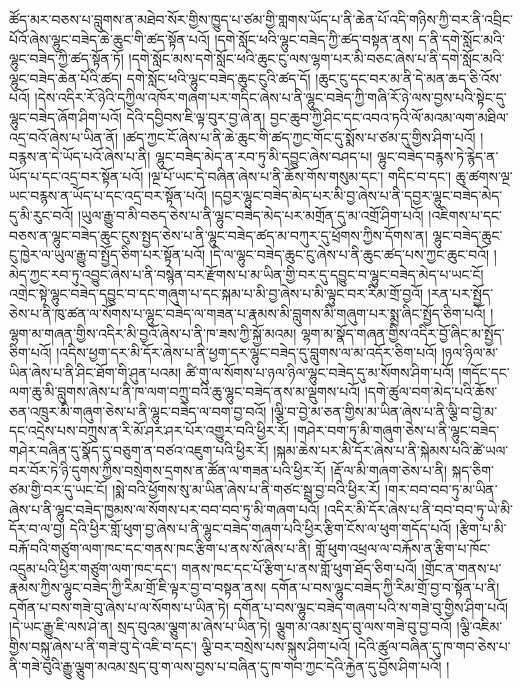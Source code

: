 ཚོད་མར་བཅས་པ་བླུགས་ན་མཐེབ་སོར་གྱིས་ཁྱུད་པ་ཙམ་གྱི་གླགས་ཡོད་པ་ནི་ཆེན་པོ་འདི་གཉིས་ཀྱི་བར་ནི་འབྲིང་པོའོ་ཞེས་ལྷུང་བཟེད་ཆེ་ཆུང་གི་ཚད་སྟོན་པའོ། །དགེ་སློང་ཕའི་ལྷུང་བཟེད་ཀྱི་ཚད་བསྟན་ནས། ད་ནི་དགེ་སློང་མའི་ལྷུང་བཟེད་ཀྱི་ཚད་སྟོན་ཏོ། །དགེ་སློང་མས་དགེ་སློང་ཕའི་ཆུང་ངུ་ལས་ལྷག་པར་མི་བཅང་ཞེས་པ་ནི་དགེ་སློང་མའི་ལྷུང་བཟེད་ཆེན་པོའི་ཚད། དགེ་སློང་ཕའི་ལྷུང་བཟེད་ཆུང་ངུའི་ཚད་དོ། །ཆུང་ངུ་དང་བར་མ་ནི་དེ་མན་ཆད་ཅི་འོས་པའོ། །དེས་འདིར་རོ་ཉེའི་དཀྱིལ་འཁོར་གཞག་པར་གདིང་ཞེས་པ་ནི་ལྷུང་བཟེད་ཀྱི་གཞི་རོ་ཉེ་ལས་བྱས་པའི་སྟེང་དུ་ལྷུང་བཟེད་ཞོག་ཤིག་པའོ། དེའི་དབྱིབས་ཇི་ལྟ་བུར་བྱ་ཞེ་ན། བྱང་ཆུབ་ཀྱི་ཤིང་དང་འབའ་ཏའི་ལོ་མའམ་ལག་མཐིལ་འདྲ་བའོ་ཞེས་པ་ཡིན་ནོ། །ཚད་ཀྱང་ངོ་ཞེས་པ་ནི་ཆེ་ཆུང་གི་ཚད་ཀྱང་གོང་དུ་སྨོས་པ་ཙམ་དུ་གྱིས་ཤིག་པའོ། །བརྙས་ན་དེ་ཡོད་པའོ་ཞེས་པ་ནི། ལྷུང་བཟེད་མེད་ན་རབ་ཏུ་མི་དབྱུང་ཞེས་བཤད་པ། ལྷུང་བཟེད་བརྙས་ཏེ་རྙེད་ན་ཡོད་པ་དང་འདྲ་བར་སྟོན་པའོ། །ལྔ་པོ་ཡང་དེ་བཞིན་ཞེས་པ་ནི་ཆོས་གོས་གསུམ་དང་། གདིང་བ་དང་། ཆུ་ཚགས་ལྔ་ཡང་བརྙས་ན་ཡོད་པ་དང་འདྲ་བར་སྟོན་པའོ། །དབྱར་ལྷུང་བཟེད་མེད་པར་མི་བྱ་ཞེས་པ་ནི་དབྱར་ལྷུང་བཟེད་མེད་དུ་མི་རུང་བའོ། །ཡུལ་རྒྱུ་བ་མི་བཅད་ཅེས་པ་ནི་ལྷུང་བཟེད་མེད་པར་མགྲོན་དུ་མ་འགྲོ་ཤིག་པའོ། །འཇིགས་པ་དང་བཅས་ན་ལྷུང་བཟེད་ཆུང་ངུས་སྤྱད་ཅེས་པ་ནི་ལྷུང་བཟེད་ཚད་མ་བཀུར་དུ་ཕྲོགས་ཀྱིས་དོགས་ན། ལྷུང་བཟེད་ཆུང་ངུ་ཁྱེར་ལ་ཡུལ་རྒྱུ་བ་སྤྱོད་ཅིག་པར་སྟོན་པའོ། །དེ་ལ་ལྷུང་བཟེད་ཆུང་ངུ་ཞེས་པ་ནི་ཆུང་ཚད་པས་ཀྱང་ཆུང་བའོ། །མེད་ཀྱང་རབ་ཏུ་འབྱུང་ཞེས་པ་ནི་བསྙེན་བར་རྫོགས་པ་མ་ཡིན་གྱི་བར་དུ་དབྱུང་བ་ལྷུང་བཟེད་མེད་པ་ཡང་ངོ། འགྲེང་སྟེ་ལྷུང་བཟེད་དབྱུང་བ་དང་གཞུག་པ་དང་སྐམ་པ་མི་བྱ་ཞེས་པ་མི་ལྟུང་བར་རིམ་གྲོ་བྱའོ། །རན་པར་སྤྱོད་ཅེས་པ་ནི་ཁུ་ཚན་ལ་སོགས་པ་ལྷུང་བཟེད་ལ་གཟན་པ་རྣམས་མི་བླུགས་མི་གཞུག་པར་སྨྲ་ཞིང་སྤྱོད་ཅིག་པའོ། །ལྷག་མ་གཞན་གྱིས་འདིར་མི་བྱའོ་ཞེས་པ་ནི་ཁ་ཟས་ཀྱི་སྐྱོ་མའམ། ལྷག་མ་སྣོད་གཞན་གྱིས་འདིར་བྱོ་ཞིང་མ་སྤྱོད་ཅིག་པའོ། །འདིས་ཕྱག་དར་མི་དོར་ཞེས་པ་ནི་ཕྱག་དར་ལྷུང་བཟེད་དུ་བླུགས་ལ་མ་འདོར་ཅིག་པའོ། །ཉལ་ཉིལ་མ་ཡིན་ཞེས་པ་ནི་ཤིང་ཐོག་གི་ཤུན་པའམ། ཚི་གུ་ལ་སོགས་པ་ཉལ་ཉིལ་ལྷུང་བཟེད་དུ་མ་སོགས་ཤིག་པའོ། །གདོང་དང་ལག་ཆུ་མི་བླུགས་ཞེས་པ་ནི་ཁ་ལག་བཀྲུ་བའི་ཆུ་ལྷུང་བཟེད་ནས་མ་ལྡུགས་པའོ། །དགེ་ཚུལ་བག་མེད་པའི་ཆོས་ཅན་འཁྲུར་མི་གཞུག་ཅེས་པ་ནི་ལྷུང་བཟེད་ལ་བག་བྱ་བའོ། །ལྕི་བ་བྱེ་མ་ཅན་གྱིས་མ་ཡིན་ཞེས་པ་ནི་ལྕི་བ་བྱེ་མ་དང་འདྲེས་པས་བཀྲུས་ན་རི་མོ་ཤར་ཤར་པོར་འགྱུར་བའི་ཕྱིར་རོ། །གཤེར་བག་ཏུ་མི་གཞུག་ཅེས་པ་ནི་ལྷུང་བཟེད་གཤེར་བཞིན་དུ་སྣོད་དུ་བཅུག་ན་བཙའ་འཇུག་པའི་ཕྱིར་རོ། །སྐམ་ཆེས་པར་མི་དོར་ཞེས་པ་ནི་སྐེམས་པའི་ཚེ་ཡལ་བར་བོར་ཏེ་ཉི་དུགས་ཀྱིས་བསྲེགས་དྲགས་ན་ཚོན་ལ་གཟན་པའི་ཕྱིར་རོ། །རྡོ་ལ་མི་གཞག་ཅེས་པ་ནི། སྐད་ཅིག་ཙམ་གྱི་བར་དུ་ཡང་ངོ། །སྨེ་བའི་ཕྱོགས་སུ་མ་ཡིན་ཞེས་པ་ནི་གཙང་སྦྲ་བྱ་བའི་ཕྱིར་རོ། །གར་བབ་བབ་ཏུ་མ་ཡིན་ཞེས་པ་ནི་ལྷུང་བཟེད་ཁྱམས་ལ་སོགས་པར་བབ་བབ་ཏུ་མི་གཞག་པའོ། །འདིར་མི་དོར་ཞེས་པ་ནི་བབ་བབ་ཏུ་ཡེ་མི་དོར་བ་ལ་བྱ། དེའི་ཕྱིར་གློ་ཕུག་བྱ་ཞེས་པ་ནི་ལྷུང་བཟེད་གཞག་པའི་ཕྱིར་རྩིག་ངོས་ལ་ཕུག་གདོད་པའོ། །རྩིག་པ་མི་བརྐོ་བའི་གཙུག་ལག་ཁང་དང་གནས་ཁང་རྩིག་པ་ནས་སོ་ཞེས་པ་ནི། གློ་ཕུག་འཕྲལ་ལ་བརྐོས་ན་རྩིག་པ་ཁོང་འདྲུམ་པའི་ཕྱིར་གཙུག་ལག་ཁང་དང་། གནས་ཁང་དང་པོ་རྩིག་པ་ནས་གློ་ཕུག་ཐོད་ཅིག་པའོ། །གྲོང་ན་གནས་པ་རྣམས་ཀྱིས་ལྷུང་བཟེད་ཀྱི་རིམ་གྲོ་ཇི་ལྟར་བྱ་བ་བསྟན་ནས། དགོན་པ་བས་ལྷུང་བཟེད་ཀྱི་རིམ་གྲོ་བྱ་བ་སྟོན་པ་ནི། དགོན་པ་བས་གཟེ་བུ་ཞེས་པ་ལ་སོགས་པ་ཡིན་ཏེ། དགོན་པ་བས་ལྷུང་བཟེད་གཞག་པའི་ས་གཟེ་བུ་གྱིས་ཤིག་པའོ། །དེ་ཡང་རྒྱུ་ཇི་ལས་ཤེ་ན། སྲད་བུའམ་ལྕུག་མ་ཞེས་པ་ཡིན་ཏེ། ལྕུག་མ་འམ་སྲད་བུ་ལས་གཟེ་བུ་བྱ་བའོ། །ལྕི་འཇིམ་གྱིས་བསྐུ་ཞེས་པ་ནི་གཟེ་བུ་དེ་འཇི་བ་དང་། ལྕི་བར་བསྲེས་པས་སྐུས་ཤིག་པའོ། །དེའི་ཚུལ་བཞིན་དུ་ཁ་གབ་ཅེས་པ་ནི་གཟེ་བུའི་རྒྱུ་ལྕུག་མའམ་སྲད་བུ་ག་ལས་བྱས་པ་བཞིན་དུ་ཁ་གབ་ཀྱང་དེའི་རྐྱེན་དུ་བྱོས་ཤིག་པའོ། །
